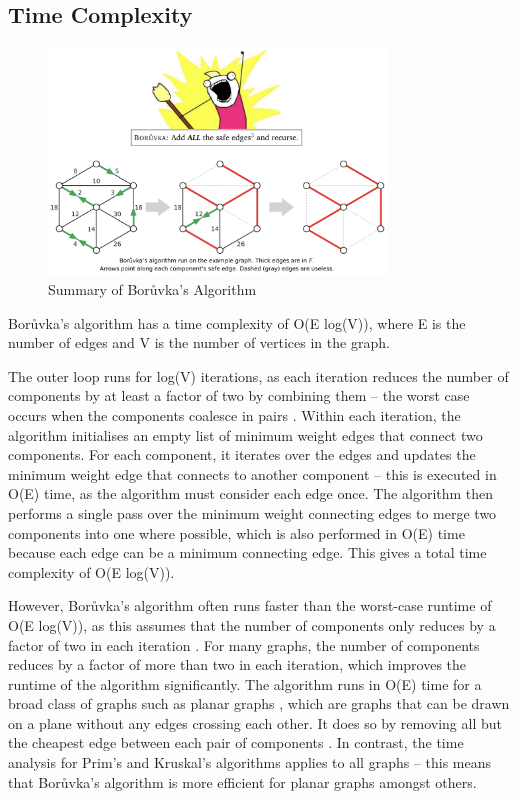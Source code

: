 \documentclass[a4paper, 11pt]{article}
\begin{document}
\subsection{Time Complexity}
\begin{figure}[h]
    \caption{Summary of Borůvka's Algorithm \cite{erickson2014MSTs}}
    \begin{center}
        \includegraphics[width=0.8\textwidth]{Summary of Boruvka's Algorithm.png}
    \end{center}
\end{figure}

Borůvka's algorithm has a time complexity of O(E log(V)), where E is the number of edges and V is the number of vertices in the graph.

The outer loop runs for log(V) iterations, as each iteration reduces the number of components by at least a factor of two by combining them -- the worst case occurs when the components coalesce in pairs \cite{erickson2014MSTs}. Within each iteration, the algorithm initialises an empty list of minimum weight edges that connect two components. For each component, it iterates over the edges and updates the minimum weight edge that connects to another component -- this is executed in O(E) time, as the algorithm must consider each edge once. The algorithm then performs a single pass over the minimum weight connecting edges to merge two components into one where possible, which is also performed in O(E) time because each edge can be a minimum connecting edge. This gives a total time complexity of O(E log(V)).

However, Borůvka's algorithm often runs faster than the worst-case runtime of O(E log(V)), as this assumes that the number of components only reduces by a factor of two in each iteration \cite{erickson2014MSTs}. For many graphs, the number of components reduces by a factor of more than two in each iteration, which improves the runtime of the algorithm significantly. The algorithm runs in O(E) time for a broad class of graphs such as planar graphs \cite{cheriton1976finding}, which are graphs that can be drawn on a plane without any edges crossing each other. It does so by removing all but the cheapest edge between each pair of components \cite{marevs2002two}. In contrast, the time analysis for Prim's and Kruskal's algorithms applies to all graphs -- this means that Borůvka's algorithm is more efficient for planar graphs amongst others.
\end{document}
